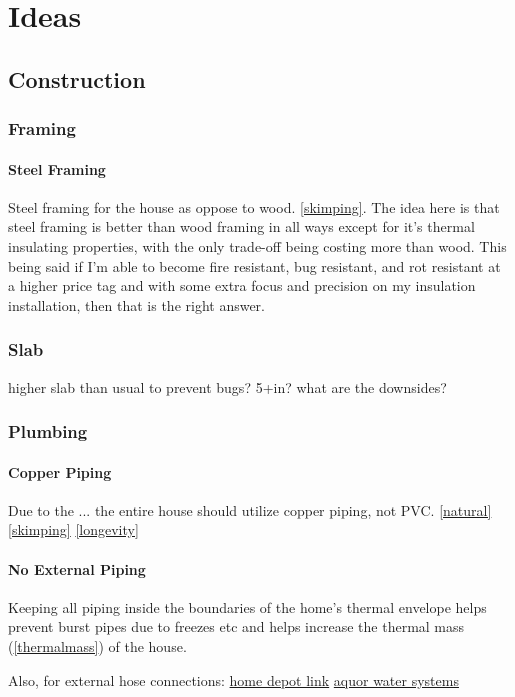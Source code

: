 \documentclass{article}
\begin{document}
\clearpage
\section{Ideas} \label{ideas}

\subsection{Construction}
\subsubsection{Framing}
\paragraph{Steel Framing}
Steel framing for the house as oppose to wood. \ref{skimping}. The idea here is that steel framing is better than wood framing in all ways except for it's thermal insulating properties, with the only trade-off being costing more than wood. This being said if I'm able to become fire resistant, bug resistant, and rot resistant at a higher price tag and with some extra focus and precision on my insulation installation, then that is the right answer.

\subsubsection{Slab}
higher slab than usual to prevent bugs? 5+in? what are the downsides?

\subsubsection{Plumbing}
\paragraph{Copper Piping}
Due to the ... the entire house should utilize copper piping, not PVC. \ref{natural} \ref{skimping} \ref{longevity}

\paragraph{No External Piping}
Keeping all piping inside the boundaries of the home's thermal envelope helps prevent burst pipes due to freezes etc and helps increase the thermal mass (\ref{thermalmass}) of the house.

Also, for external hose connections: \href{https://www.homedepot.com/p/AQUOR-1-2-in-NPT-Inlet-and-3-4-in-Faucet-Hose-Connector-4-in-House-Hydrant-V1-Modern-Outdoor-Wall-Faucet-HHP004-HD/326637204?source=shoppingads&locale=en-US&gQT=1}{home depot link}
\href{https://www.aquorwatersystems.com}{aquor water systems}
\end{document}
